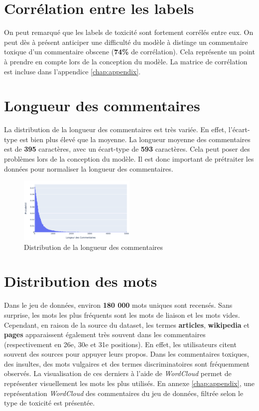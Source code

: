 \newpage
\section*{Corrélation entre les labels}
On peut remarqué que les labels de toxicité sont fortement corrélés entre eux. 
On peut dès à présent anticiper une difficulté du modèle à distinge un commentaire toxique d'un commentaire obscene (\textbf{74\%} de corrélation).
Cela représente un point à prendre en compte lors de la conception du modèle. La matrice de corrélation est incluse dans l'appendice \ref{chap:appendix}. 

\section*{Longueur des commentaires}
La distribution de la longueur des commentaires est très variée. En effet, l'écart-type est bien plus élevé que la moyenne. 
La longueur moyenne des commentaires est de \textbf{395} caractères, avec un écart-type de \textbf{593} caractères. 
Cela peut poser des problèmes lors de la conception du modèle. Il est donc important de prétraiter les données pour normaliser la longueur des commentaires.
\begin{figure}[h]
    \centering
    \includegraphics[width=0.5\textwidth]{figures/long-commentaire-prob.png}
    \caption{Distribution de la longueur des commentaires}
\end{figure}

\section*{Distribution des mots}
Dans le jeu de données, environ \textbf{180 000} mots uniques sont recensés. 
Sans surprise, les mots les plus fréquents sont les mots de liaison et les mots vides.
Cependant, en raison de la source du dataset, les termes \textbf{articles}, \textbf{wikipedia} et \textbf{pages} apparaissent également très souvent dans les commentaires (respectivement en 26e, 30e et 31e positions).
En effet, les utilisateurs citent souvent des sources pour appuyer leurs propos. Dans les commentaires toxiques, des insultes, des mots vulgaires et des termes discriminatoires sont fréquemment observés. 
La visualisation de ces derniers à l'aide de \textit{\textit{WordCloud}} permet de représenter visuellement les mots les plus utilisés. 
En annexe \ref{chap:appendix}, une représentation \textit{\textit{WordCloud}} des commentaires du jeu de données, filtrée selon le type de toxicité est présentée.